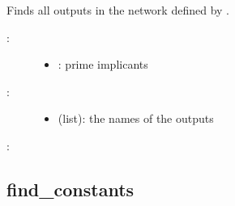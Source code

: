 \documentclass[letterpaper,10pt,english]{sphinxmanual}
\begin{document}
\begin{fulllineitems}
\label{\detokenize{PrimeImplicants:PyBoolNet.PrimeImplicants.find_outputs}}
Finds all outputs in the network defined by .
\begin{description}
\item[{:}] \leavevmode\begin{itemize}
\item {} 
: prime implicants

\end{itemize}

\item[{:}] \leavevmode\begin{itemize}
\item {} 
 (list): the names of the outputs

\end{itemize}

\end{description}

:

\begin{sphinxVerbatim}[commandchars=\\\{\}]
\end{sphinxVerbatim}

\end{fulllineitems}



\subsection{find\_constants}
\label{\detokenize{PrimeImplicants:id5}}\label{\detokenize{PrimeImplicants:find-constants}}
\end{document}
